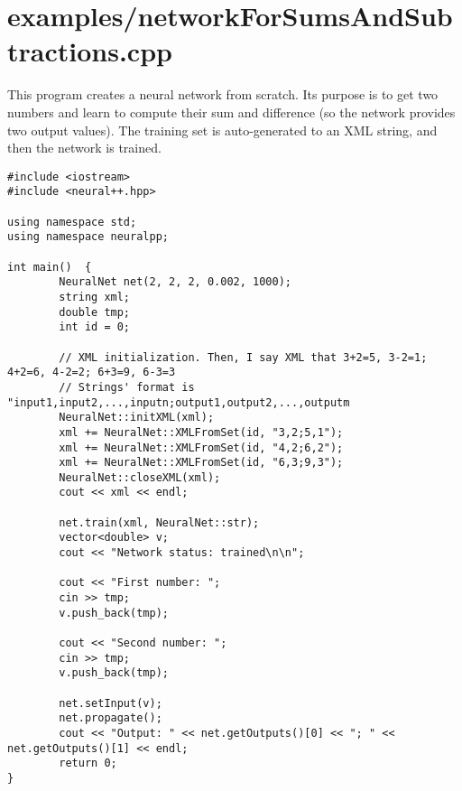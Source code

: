 \section{examples/networkForSumsAndSubtractions.cpp}
This program creates a neural network from scratch. Its purpose is to get two numbers and learn to compute their sum and difference (so the network provides two output values). The training set is auto-generated to an XML string, and then the network is trained.



\begin{DocInclude}\begin{verbatim}
#include <iostream>
#include <neural++.hpp>

using namespace std;
using namespace neuralpp;

int main()  {
        NeuralNet net(2, 2, 2, 0.002, 1000);
        string xml;
        double tmp;
        int id = 0;

        // XML initialization. Then, I say XML that 3+2=5, 3-2=1; 4+2=6, 4-2=2; 6+3=9, 6-3=3
        // Strings' format is "input1,input2,...,inputn;output1,output2,...,outputm
        NeuralNet::initXML(xml);
        xml += NeuralNet::XMLFromSet(id, "3,2;5,1");
        xml += NeuralNet::XMLFromSet(id, "4,2;6,2");
        xml += NeuralNet::XMLFromSet(id, "6,3;9,3");
        NeuralNet::closeXML(xml);
        cout << xml << endl;
        
        net.train(xml, NeuralNet::str);
        vector<double> v;
        cout << "Network status: trained\n\n";

        cout << "First number: ";
        cin >> tmp;
        v.push_back(tmp);

        cout << "Second number: ";
        cin >> tmp;
        v.push_back(tmp);

        net.setInput(v);
        net.propagate();
        cout << "Output: " << net.getOutputs()[0] << "; " << net.getOutputs()[1] << endl;
        return 0;
}

\end{verbatim}
\end{DocInclude}
 